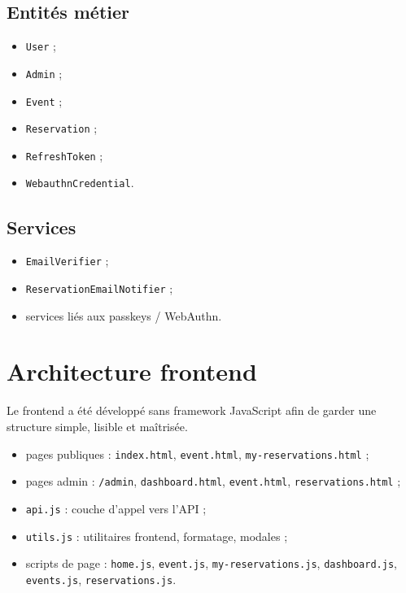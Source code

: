 \documentclass[12pt,a4paper]{report}
\begin{document}
\subsection{Entités métier}
\begin{itemize}[leftmargin=1.2cm]
    \item \texttt{User} ;
    \item \texttt{Admin} ;
    \item \texttt{Event} ;
    \item \texttt{Reservation} ;
    \item \texttt{RefreshToken} ;
    \item \texttt{WebauthnCredential}.
\end{itemize}

\subsection{Services}
\begin{itemize}[leftmargin=1.2cm]
    \item \texttt{EmailVerifier} ;
    \item \texttt{ReservationEmailNotifier} ;
    \item services liés aux passkeys / WebAuthn.
\end{itemize}

\section{Architecture frontend}

Le frontend a été développé sans framework JavaScript afin de garder une structure simple, lisible et maîtrisée.

\begin{itemize}[leftmargin=1.2cm]
    \item pages publiques : \texttt{index.html}, \texttt{event.html}, \texttt{my-reservations.html} ;
    \item pages admin : \texttt{/admin}, \texttt{dashboard.html}, \texttt{event.html}, \texttt{reservations.html} ;
    \item \texttt{api.js} : couche d'appel vers l'API ;
    \item \texttt{utils.js} : utilitaires frontend, formatage, modales ;
    \item scripts de page : \texttt{home.js}, \texttt{event.js}, \texttt{my-reservations.js}, \texttt{dashboard.js}, \texttt{events.js}, \texttt{reservations.js}.
\end{itemize}
\end{document}
